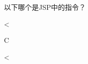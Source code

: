 \begin{question}
	以下哪个是JSP中的指令？
	\begin{options}
		\item <jsp:include>
		\item <jsp:forward>
		\item <%
		\item <jsp:param>
	\end{options}
	\begin{answer}
		C
	\end{answer}
	\begin{explanation}
		<%
	\end{explanation}
\end{question}
